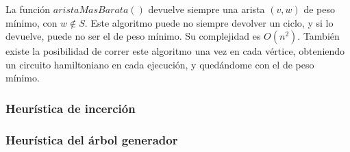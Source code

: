 La funci\'on $aristaMasBarata()$ devuelve siempre una arista $(v,w)$ de peso m\'inimo, con $w \not\in S$. Este algoritmo puede no siempre devolver un ciclo, y si lo devuelve, puede no ser el de peso m\'inimo. Su complejidad es $O(n^2)$. Tambi\'en existe la posibilidad de correr este algoritmo una vez en cada v\'ertice, obteniendo un circuito hamiltoniano en cada ejecuci\'on, y qued\'andome con el de peso m\'inimo.

\newpage
\subsubsection*{Heur\'istica de incerci\'on}
\subsubsection*{Heur\'istica del \'arbol generador}
